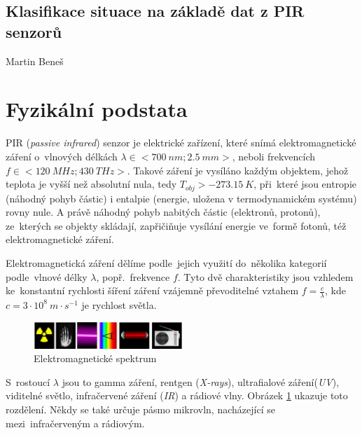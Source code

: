 \documentclass[10pt,a4paper,titlepage]{article}
\begin{document}

  \begin{center}
    \section*{Klasifikace situace na základě dat z PIR senzorů}
    Martin Beneš
  \end{center}
  \newpage

  \tableofcontents
  \newpage

  \section{Fyzikální podstata}
  PIR ({\it passive infrared}) senzor je elektrické zařízení, které snímá elektromagnetické záření
  o~vlnových délkách $\lambda\in<700~nm;2.5~mm>$, neboli frekvencích $f\in<120~MHz;430~THz>$.
  Takové záření je vysíláno každým objektem, jehož teplota je vyšší než absolutní nula, tedy
  $T_{obj}>-273.15~K$, při~které jsou entropie (náhodný pohyb částic) i entalpie (energie, uložena
  v termodynamickém systému) rovny nule. A právě náhodný pohyb nabitých částic (elektronů, protonů),
  ze~kterých se objekty skládají, zapřičiňuje vysílání energie ve~formě fotonů, též elektromagnetické
  záření.

  Elektromagnetická záření dělíme podle~jejich využití do~několika kategorií podle~vlnové délky $\lambda$,
  popř.~frekvence $f$. Tyto dvě charakteristiky jsou vzhledem ke~konstantní rychlosti šíření záření
  vzájemně převoditelné vztahem $f=\frac{c}{\lambda}$, kde~$c=3\cdot10^{8}~m\cdot s^{-1}$ je rychlost světla. 

  \begin{figure}[h!]
    \begin{center}
      \includegraphics[width=0.5\textwidth]{spectrum.png}
      \caption[title=Obrazek]{Elektromagnetické spektrum\label{fig:spectrum} \cite{IZGcolors}}
    \end{center}    
  \end{figure}

  S~rostoucí $\lambda$ jsou to gamma záření, rentgen ({\it X-rays}), ultrafialové záření({\it UV}),
  viditelné světlo, infračervené záření ({\it IR}) a rádiové vlny. Obrázek \ref{fig:spectrum} ukazuje
  toto rozdělení. Někdy se také určuje pásmo mikrovln, nacházející se mezi~infračerveným a rádiovým.
\end{document}
